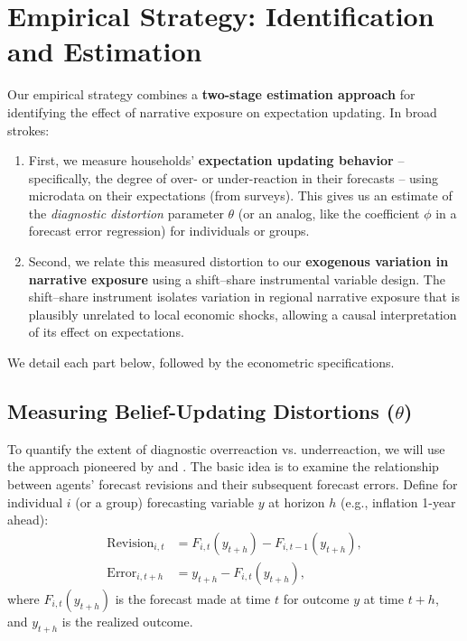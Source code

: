 \documentclass[12pt]{article}
\begin{document}
\section{Empirical Strategy: Identification and Estimation}
Our empirical strategy combines a \textbf{two-stage estimation approach} for identifying the effect of narrative exposure on expectation updating. In broad strokes:
\begin{enumerate}
    \item First, we measure households' \textbf{expectation updating behavior} – specifically, the degree of over- or under-reaction in their forecasts – using microdata on their expectations (from surveys). This gives us an estimate of the \emph{diagnostic distortion} parameter $\theta$ (or an analog, like the coefficient $\phi$ in a forecast error regression) for individuals or groups.
    \item Second, we relate this measured distortion to our \textbf{exogenous variation in narrative exposure} using a shift–share instrumental variable design. The shift–share instrument isolates variation in regional narrative exposure that is plausibly unrelated to local economic shocks, allowing a causal interpretation of its effect on expectations.
\end{enumerate}
We detail each part below, followed by the econometric specifications.


\subsection{Measuring Belief-Updating Distortions ($\theta$)}
To quantify the extent of diagnostic overreaction vs. underreaction, we will use the approach pioneered by \citet{CoibionGorodnichenko2015} and \citet{BordaloGennaioliMaShleifer2020}. The basic idea is to examine the relationship between agents' forecast revisions and their subsequent forecast errors. Define for individual $i$ (or a group) forecasting variable $y$ at horizon $h$ (e.g., inflation 1-year ahead):
\begin{align*}
    \text{Revision}_{i,t} & = F_{i,t}(y_{t+h}) - F_{i,t-1}(y_{t+h}), \\
    \text{Error}_{i,t+h}  & = y_{t+h} - F_{i,t}(y_{t+h}),
\end{align*}
where $F_{i,t}(y_{t+h})$ is the forecast made at time $t$ for outcome $y$ at time $t+h$, and $y_{t+h}$ is the realized outcome.
\end{document}
